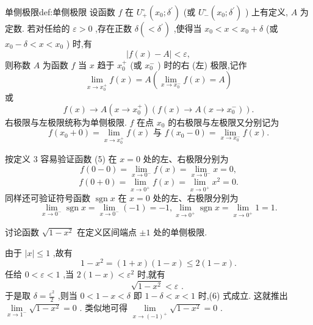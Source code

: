 \begin{definition}{单侧极限}{def:单侧极限}
设函数 \(f\) 在 \({U}_{ + }^{ \circ  }\left( {{x}_{0};{\delta }^{\prime }}\right)\) (或 \({U}_{ - }^{ \circ  }\left( {{x}_{0};{\delta }^{\prime }}\right)\) ) 上有定义, \(A\) 为定数. 若对任给的 \(\varepsilon  > 0\) ,存在正数 \(\delta \left( { < {\delta }^{\prime }}\right)\) ,使得当 \({x}_{0} < x < {x}_{0} + \delta\) (或 \({x}_{0} - \delta  < x < {x}_{0}\) ) 时,有
\[
\left| {f\left( x\right)  - A}\right|  < \varepsilon ,
\]
则称数 \(A\) 为函数 \(f\) 当 \(x\) 趋于 \({x}_{0}^{ + }\) (或 \({x}_{0}^{ - }\) ) 时的右 (左) 极限,记作
\[
\mathop{\lim }\limits_{{x \rightarrow  {x}_{0}^{ + }}}f\left( x\right)  = A\left( {\mathop{\lim }\limits_{{x \rightarrow  {x}_{0}^{ - }}}f\left( x\right)  = A}\right)
\]
或
\[
f\left( x\right)  \rightarrow  A\left( {x \rightarrow  {x}_{0}^{ + }}\right) \left( {f\left( x\right)  \rightarrow  A\left( {x \rightarrow  {x}_{0}^{ - }}\right) }\right) .
\]
右极限与左极限统称为单侧极限. \(f\) 在点 \({x}_{0}\) 的右极限与左极限又分别记为
\[
f\left( {{x}_{0} + 0}\right)  = \mathop{\lim }\limits_{{x \rightarrow  {x}_{0}^{ + }}}f\left( x\right) \text{ 与 }f\left( {{x}_{0} - 0}\right)  = \mathop{\lim }\limits_{{x \rightarrow  {x}_{0}^{ - }}}f\left( x\right) .
\]
\end{definition}

按定义 3 容易验证函数 (5) 在 \(x = 0\) 处的左、右极限分别为
\[
f\left( {0 - 0}\right)  = \mathop{\lim }\limits_{{x \rightarrow  {0}^{ - }}}f\left( x\right)  = \mathop{\lim }\limits_{{x \rightarrow  {0}^{ - }}}x = 0,
\]
\[
f\left( {0 + 0}\right)  = \mathop{\lim }\limits_{{x \rightarrow  {0}^{ + }}}f\left( x\right)  = \mathop{\lim }\limits_{{x \rightarrow  {0}^{ + }}}{x}^{2} = 0.
\]
同样还可验证符号函数 \(\operatorname{sgn}x\) 在 \(x = 0\) 处的左、右极限分别为
\[
\mathop{\lim }\limits_{{x \rightarrow  {0}^{ - }}}\operatorname{sgn}x = \mathop{\lim }\limits_{{x \rightarrow  {0}^{ - }}}\left( {-1}\right)  =  - 1,\mathop{\lim }\limits_{{x \rightarrow  {0}^{ + }}}\operatorname{sgn}x = \mathop{\lim }\limits_{{x \rightarrow  {0}^{ + }}}1 = 1.
\]
\begin{example}

\end{example}
讨论函数 \(\sqrt{1 - {x}^{2}}\) 在定义区间端点 \(\pm  1\) 处的单侧极限.

\begin{solution}

\end{solution}
由于 \(\left| x\right|  \leq  1\) ,故有
\[
1 - {x}^{2} = \left( {1 + x}\right) \left( {1 - x}\right)  \leq  2\left( {1 - x}\right) .
\]
任给 \(0 < \varepsilon  < 1\) ,当 \(2\left( {1 - x}\right)  < {\varepsilon }^{2}\) 时,就有
\[
\sqrt{1 - {x}^{2}} < \varepsilon \text{ . } \tag{6}
\]
于是取 \(\delta  = \frac{{\varepsilon }^{2}}{2}\) ,则当 \(0 < 1 - x < \delta\) 即 \(1 - \delta  < x < 1\) 时,(6) 式成立. 这就推出 \(\mathop{\lim }\limits_{{x \rightarrow  {1}^{ - }}}\sqrt{1 - {x}^{2}} = 0\) . 类似地可得 \(\mathop{\lim }\limits_{{x \rightarrow  {\left( -1\right) }^{ + }}}\sqrt{1 - {x}^{2}} = 0\) .

